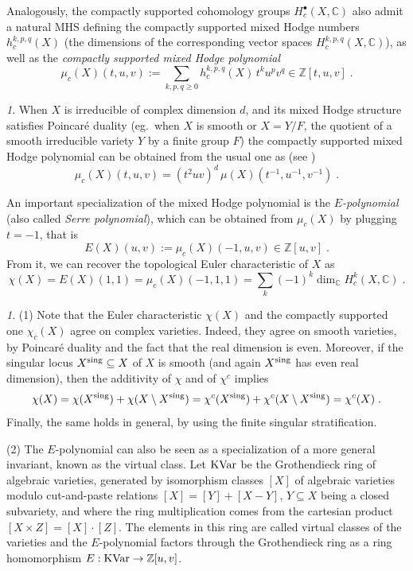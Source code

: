 \documentclass[11pt,english]{amsart}
\numberwithin{equation}{section}
\numberwithin{figure}{section}
\theoremstyle{plain}
\theoremstyle{plain}
\theoremstyle{definition}
\theoremstyle{remark}
\newtheorem{rem}[thm]{\protect\remarkname}
\newcommand{\ZZ}{\mathbb{Z}}
\newcommand{\CC}{\mathbb{C}}
\providecommand{\remarkname}{Remark}
\begin{document}
Analogously, the compactly supported cohomology groups $H_c^\bullet(X,\CC)$ also admit a natural MHS defining the compactly supported mixed Hodge numbers
$h_c^{k,p,q}(X)$ (the dimensions of the corresponding vector spaces
$H_c^{k,p,q}(X,\mathbb{C})$),
as well as the \emph{compactly supported mixed Hodge polynomial}
\[
\mu_c(X)(t,u,v):=\sum_{k,p,q\geq0}h_c^{k,p,q}(X)\,t^{k}u^{p}v^{q} \in \ZZ[t,u,v]\; .
\]

\begin{rem}
\label{rem:mu-and-muc} When $X$ is irreducible of complex dimension $d$,
and its mixed Hodge structure satisfies Poincar\'e duality (eg.\ when $X$ is smooth
or $X=Y/F$, the quotient of a smooth irreducible variety $Y$ by a finite
group $F$) the compactly supported mixed Hodge polynomial can be obtained from the usual one as (see \cite[Remark 3.10]{FS})
\[
\mu_c(X)(t,u,v)=(t^{2}uv)^{d}\,\mu(X)(t^{-1},u^{-1},v^{-1})\; .
\]

\end{rem}

An important specialization of the mixed Hodge polynomial is the \emph{$E$-polynomial} (also called \emph{Serre polynomial}), which can be obtained from $\mu_{c}(X)$
by plugging
$t=-1$, that is 
\[
E(X)(u,v):=\mu_c(X)(-1,u,v) \in \ZZ[u,v]\; .
\]
From it, we can recover the topological Euler characteristic
of $X$ as 
\[
\chi(X)=E(X)(1,1)=\mu_c(X)(-1,1,1)=\sum_{k}(-1)^{k}\dim_{\CC}H_{c}^{k}(X,\CC)\; .
\]

\begin{rem}
(1) Note that the Euler characteristic $\chi(X)$ and the compactly supported 
one $\chi_c(X)$ agree on complex varieties. Indeed, they agree on smooth varieties, 
by Poincar\'e duality and the fact that the real dimension is even. Moreover, if the singular locus $X^{\textup{sing}}\subseteq X$ of $X$ is smooth (and again $X^{\textup{sing}}$ has even real dimension),
then the additivity of $\chi$ and of $\chi^c$ implies 
\[
\chi(X)=\chi(X^{\textup{sing}})+\chi(X\setminus X^{\textup{sing}})=
\chi^c(X^{\textup{sing}})+\chi^c(X\setminus X^{\textup{sing}})=\chi^c(X)\; .
\]
Finally, the same holds in general, by using the finite singular stratification.

(2) The $E$-polynomial can also be seen as a specialization of a more general
invariant, known as the virtual class. Let ${\rm KVar}$ be the Grothendieck
ring of algebraic varieties, generated by isomorphism classes $[X]$ of algebraic varieties
modulo cut-and-paste relations $[X]=[Y]+[X-Y]$, $Y\subseteq X$ being
a closed subvariety, and where the ring multiplication comes from
the cartesian product $[X\times Z]=[X]\cdot[Z]$. The elements in
this ring are called virtual classes of the varieties and the $E$-polynomial
factors through the Grothendieck ring as a ring homomorphism $E:{\rm KVar}\rightarrow\mathbb{Z}[u,v]$. 
\end{rem}
\end{document}
